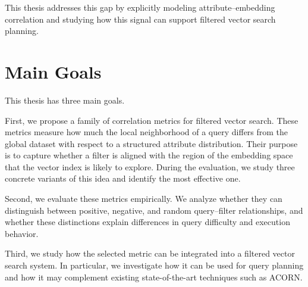 This thesis addresses this gap by explicitly modeling attribute--embedding correlation and studying how this signal can support filtered vector search planning.

\section{Main Goals}

This thesis has three main goals.

First, we propose a family of correlation metrics for filtered vector search.
These metrics measure how much the local neighborhood of a query differs from the global dataset with respect to a structured attribute distribution.
Their purpose is to capture whether a filter is aligned with the region of the embedding space that the vector index is likely to explore.
During the evaluation, we study three concrete variants of this idea and identify the most effective one.

Second, we evaluate these metrics empirically.
We analyze whether they can distinguish between positive, negative, and random query--filter relationships,
and whether these distinctions explain differences in query difficulty and execution behavior.

Third, we study how the selected metric can be integrated into a filtered vector search system.
In particular, we investigate how it can be used for query planning and how it may complement existing state-of-the-art techniques such as ACORN.
